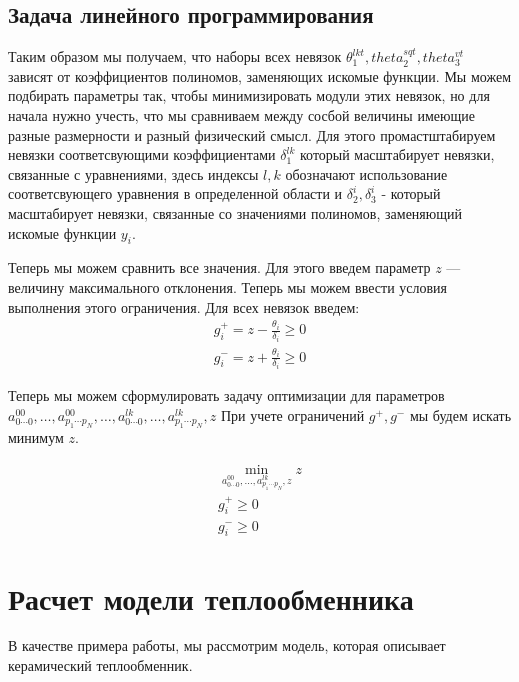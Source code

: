 \documentclass[a4paper,12pt]{article}
\begin{document}
  \subsection{Задача линейного программирования}
   
  Таким образом мы получаем, что наборы всех невязок
  $\theta^{lkt}_1,theta^{sqt}_2,theta^{vt}_3$ зависят от коэффициентов
  полиномов, заменяющих искомые функции. Мы можем подбирать параметры
  так, чтобы минимизировать модули этих невязок, но для начала нужно учесть,
  что мы сравниваем между сосбой величины имеющие разные размерности и
  разный физический смысл. Для этого промастштабируем невязки
  соответсвующими коэффициентами $\delta^{lk}_1$ который масштабирует
  невязки, связанные с уравнениями, здесь индексы $l,k$ обозначают
  использование соответсвующего уравнения в определенной области и
  $\delta^{i}_2, \delta^{i}_3$ - который масштабирует невязки,
  связанные со значениями полиномов, заменяющий искомые функции $y_i$.

  Теперь мы можем сравнить все значения. Для этого введем параметр $z$ ---
  величину максимального отклонения. Теперь мы можем ввести условия выполнения этого ограничения.
  Для всех невязок введем:
  \begin{eqnarray}
    g^{+}_i = z - \frac{\theta_i}{\delta_i} \ge 0\\
    g^{-}_i = z + \frac{\theta_i}{\delta_i} \ge 0
  \end{eqnarray}

  Теперь мы можем сформулировать задачу оптимизации для параметров
  $a^{00}_{0 \cdots 0},\ldots,a^{00}_{p_1 \cdots p_N},\ldots,a^{lk}_{0 \cdots 0},\ldots,a^{lk}_{p_1 \cdots p_N},z$
  При учете ограничений $g^{+},g^{-}$ мы будем искать минимум $z$.

  \begin{eqnarray*}
    \min_{a^{00}_{0 \cdots 0},\ldots,a^{lk}_{p_1 \cdots p_N},z} z \\
    g^{+}_i \ge 0 \\
    g^{-}_i \ge 0
  \end{eqnarray*}
  
  \section{Расчет модели теплообменника}

  В качестве примера работы, мы рассмотрим модель, которая описывает
  керамический теплообменник.
\end{document}

